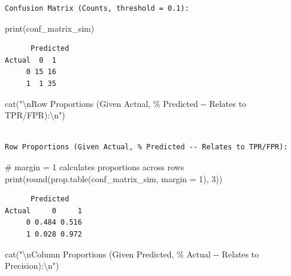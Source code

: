 \documentclass[
  letterpaper,
  DIV=11,
  numbers=noendperiod]{scrreprt}
\newenvironment{Shaded}{\begin{snugshade}}{\end{snugshade}}
\newcommand{\AttributeTok}[1]{\textcolor[rgb]{0.40,0.45,0.13}{#1}}
\newcommand{\CommentTok}[1]{\textcolor[rgb]{0.37,0.37,0.37}{#1}}
\newcommand{\DecValTok}[1]{\textcolor[rgb]{0.68,0.00,0.00}{#1}}
\newcommand{\FunctionTok}[1]{\textcolor[rgb]{0.28,0.35,0.67}{#1}}
\newcommand{\NormalTok}[1]{\textcolor[rgb]{0.00,0.23,0.31}{#1}}
\newcommand{\SpecialCharTok}[1]{\textcolor[rgb]{0.37,0.37,0.37}{#1}}
\newcommand{\StringTok}[1]{\textcolor[rgb]{0.13,0.47,0.30}{#1}}
\begin{document}
\begin{verbatim}
Confusion Matrix (Counts, threshold = 0.1):
\end{verbatim}

\begin{Shaded}
\begin{Highlighting}[]
\FunctionTok{print}\NormalTok{(conf\_matrix\_sim)}
\end{Highlighting}
\end{Shaded}

\begin{verbatim}
      Predicted
Actual  0  1
     0 15 16
     1  1 35
\end{verbatim}

\begin{Shaded}
\begin{Highlighting}[]
\FunctionTok{cat}\NormalTok{(}\StringTok{"}\SpecialCharTok{\textbackslash{}n}\StringTok{Row Proportions (Given Actual, \% Predicted {-}{-} Relates to TPR/FPR):}\SpecialCharTok{\textbackslash{}n}\StringTok{"}\NormalTok{)}
\end{Highlighting}
\end{Shaded}

\begin{verbatim}

Row Proportions (Given Actual, % Predicted -- Relates to TPR/FPR):
\end{verbatim}

\begin{Shaded}
\begin{Highlighting}[]
\CommentTok{\# margin = 1 calculates proportions across rows}
\FunctionTok{print}\NormalTok{(}\FunctionTok{round}\NormalTok{(}\FunctionTok{prop.table}\NormalTok{(conf\_matrix\_sim, }\AttributeTok{margin =} \DecValTok{1}\NormalTok{), }\DecValTok{3}\NormalTok{))}
\end{Highlighting}
\end{Shaded}

\begin{verbatim}
      Predicted
Actual     0     1
     0 0.484 0.516
     1 0.028 0.972
\end{verbatim}

\begin{Shaded}
\begin{Highlighting}[]
\FunctionTok{cat}\NormalTok{(}\StringTok{"}\SpecialCharTok{\textbackslash{}n}\StringTok{Column Proportions (Given Predicted, \% Actual {-}{-} Relates to Precision):}\SpecialCharTok{\textbackslash{}n}\StringTok{"}\NormalTok{)}
\end{Highlighting}
\end{Shaded}
\end{document}
